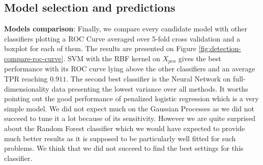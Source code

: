 \documentclass[10pt,a4paper]{article}
\begin{document}
  \subsection{Model selection and predictions}
    \textbf{Models comparison}:  Finally, we compare every candidate model with other classifiers plotting a ROC Curve averaged over 5-fold cross validation and a boxplot for each of them. The results are presented on Figure \ref{fig:detection-compare-roc-curve}. SVM with the RBF kernel on $X_{pca}$ gives the best performance with its ROC curve lying above the other classifiers and an average TPR reaching $0.911$. The second best classifier is the Neural Network on full-dimensionality data presenting the lowest variance over all methods. It worths pointing out the good performance of penalized logistic regression which is a very simple model. We did not expect much on the Gaussian Processes as we did not succeed to tune it a lot because of its sensitivity. However we are quite surprised about the Random Forest classifier which we would have expected to provide much better results as it is supposed to be particularly well fitted for such problems. We think that we did not succeed to find the best settings for this classifier.
\end{document}
